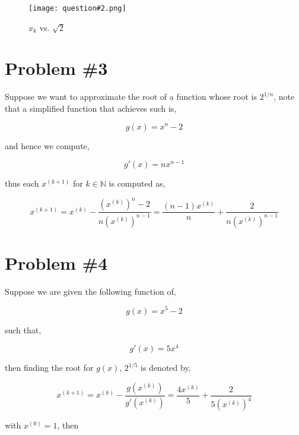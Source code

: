 \documentclass{article}
\newcommand{\NN}{\mathbb{N}}
\begin{document}
\begin{figure}[H]
    \centering
    \texttt{[image: question\#2.png]}
    \caption{$x_k$ vs. $\sqrt{2}$}
    \label{fig:my_label}
\end{figure}

\section*{Problem \#3}
Suppose we want to approximate the root of a function whose root is $2^{1/n}$, note that a simplified function that achieves such is,

\begin{equation*}
    g(x) = x^n - 2
\end{equation*}

and hence we compute,

\begin{equation*}
    g'(x) = nx^{n-1}
\end{equation*}

thus each $x^{(k+1)}$ for $k\in \NN$ is computed as,

\begin{equation*}
    x^{(k+1)} = x^{(k)} - \frac{(x^{(k)})^n-2}{n(x^{(k)})^{n-1}} = \frac{(n-1)x^{(k)}}{n} + \frac{2}{n(x^{(k)})^{n-1}}
\end{equation*}

\section*{Problem \#4}
Suppose we are given the following function of,

\begin{equation*}
    g(x) = x^5-2
\end{equation*}

such that,

\begin{equation*}
    g'(x) = 5x^4
\end{equation*}

then finding the root for $g(x)$, $2^{1/5}$ is denoted by,

\begin{equation*}
    x^{(k+1)} = x^{(k)} - \frac{g(x^{(k)})}{g'(x^{(k)})} = \frac{4x^{(k)}}{5} + \frac{2}{5(x^{(k)})^{4}}
\end{equation*}

with $x^{(0)} = 1$, then
\end{document}
